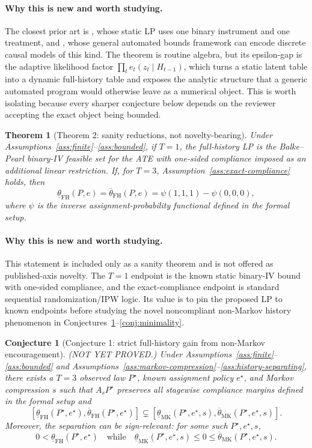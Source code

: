 \documentclass[11pt]{article}
\theoremstyle{definition}
\theoremstyle{plain}
\newtheorem{theorem}{Theorem}
\newtheorem{conjecture}{Conjecture}
\theoremstyle{remark}
\begin{document}
\paragraph{Why this is new and worth studying.}
The closest prior art is \citet{BalkePearl1997}, whose static LP uses one binary instrument and one treatment, and \citet{DuarteFinkelsteinKnoxMummoloShpitser2024}, whose general automated bounds framework can encode discrete causal models of this kind.  The theorem is routine algebra, but its epsilon-gap is the adaptive likelihood factor \(\prod_t e_t(z_t\mid H_{t-1})\), which turns a static latent table into a dynamic full-history table and exposes the analytic structure that a generic automated program would otherwise leave as a numerical object.  This is worth isolating because every sharper conjecture below depends on the reviewer accepting the exact object being bounded.

\begin{theorem}[Theorem 2: sanity reductions, not novelty-bearing]\label{thm:reductions}
Under Assumptions~\ref{ass:finite}--\ref{ass:bounded}, if \(T=1\), the full-history LP is the Balke--Pearl binary-IV feasible set for the ATE with one-sided compliance imposed as an additional linear restriction.  If, for \(T=3\), Assumption~\ref{ass:exact-compliance} holds, then
\[
\underline\theta_{\mathrm{FH}}(P,e)=\overline\theta_{\mathrm{FH}}(P,e)
=\psi(1,1,1)-\psi(0,0,0),
\]
where \(\psi\) is the inverse assignment-probability functional defined in the formal setup.
\end{theorem}
\paragraph{Why this is new and worth studying.}
This statement is included only as a sanity theorem and is not offered as published-axis novelty.  The \(T=1\) endpoint is the known \citet{BalkePearl1997} static binary-IV bound with one-sided compliance, and the exact-compliance endpoint is standard sequential randomization/IPW logic.  Its value is to pin the proposed LP to known endpoints before studying the novel noncompliant non-Markov history phenomenon in Conjectures~\ref{conj:strict-history-gain}--\ref{conj:minimality}.

\begin{conjecture}[Conjecture 1: strict full-history gain from non-Markov encouragement]\label{conj:strict-history-gain}
(NOT YET PROVED.)  Under Assumptions~\ref{ass:finite}--\ref{ass:bounded} and Assumptions~\ref{ass:markov-compression}--\ref{ass:history-separating}, there exists a \(T=3\) observed law \(P^\star\), known assignment policy \(e^\star\), and Markov compression \(s\) such that \(A_sP^\star\) preserves all stagewise compliance margins defined in the formal setup and
\[
[\underline\theta_{\mathrm{FH}}(P^\star,e^\star),\overline\theta_{\mathrm{FH}}(P^\star,e^\star)]
\subsetneq
[\underline\theta_{\mathrm{MK}}(P^\star,e^\star,s),\overline\theta_{\mathrm{MK}}(P^\star,e^\star,s)].
\]
Moreover, the separation can be sign-relevant: for some such \(P^\star,e^\star,s\),
\[
0<\underline\theta_{\mathrm{FH}}(P^\star,e^\star)
\quad\text{while}\quad
\underline\theta_{\mathrm{MK}}(P^\star,e^\star,s)\le0\le
\overline\theta_{\mathrm{MK}}(P^\star,e^\star,s).
\]
\end{conjecture}
\end{document}

